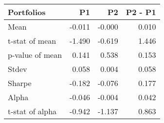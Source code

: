 \begin{tabular}{lrrr}
\toprule
Portfolios & P1 & P2 & P2 - P1 \\
\midrule
Mean & -0.011 & -0.000 & 0.010 \\
t-stat of mean & -1.490 & -0.619 & 1.446 \\
p-value of mean & 0.141 & 0.538 & 0.153 \\
Stdev & 0.058 & 0.004 & 0.058 \\
Sharpe & -0.182 & -0.076 & 0.177 \\
Alpha & -0.046 & -0.004 & 0.042 \\
t-stat of alpha & -0.942 & -1.137 & 0.863 \\
\bottomrule
\end{tabular}
